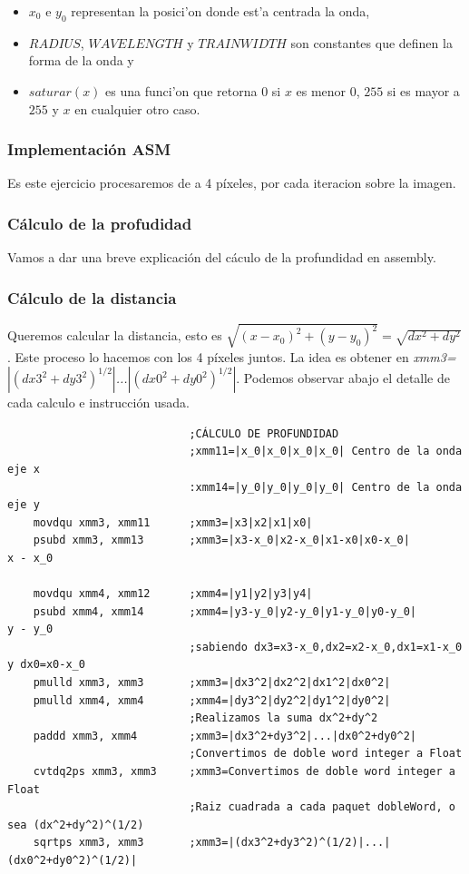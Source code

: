 \begin{itemize}
  \item $x_0$ e $y_0$ representan la posici'on donde est'a centrada la onda,
  \item $RADIUS$, $WAVELENGTH$ y $TRAINWIDTH$ son constantes que definen la 
  forma de la onda y
  \item $saturar(x)$ es una funci'on que retorna $0$ si $x$ es menor $0$, $255$
  si es mayor a $255$ y $x$ en cualquier otro caso.
\end{itemize}

\newpage
\subsubsection{Implementación ASM}
Es este ejercicio procesaremos de a 4 píxeles, por cada iteracion sobre la imagen.
\subsubsection*{Cálculo de la profudidad}
Vamos a dar una breve explicación del cáculo de la profundidad en assembly.

\subsubsection*{Cálculo de la distancia}

Queremos calcular la distancia, esto es $\sqrt{(x-x_0)^2+(y-y_0)^2} = \sqrt{dx^2+dy^2}$. Este proceso lo hacemos con los 4 píxeles juntos. La idea es obtener en \emph{xmm3=$|(dx3^2+dy3^2)^{1/2}|$...$|(dx0^2+dy0^2)^{1/2}|$}. Podemos observar abajo el detalle de cada calculo e instrucción usada.
\begin{codesnippet}
\begin{verbatim}
                            ;CÁLCULO DE PROFUNDIDAD
                            ;xmm11=|x_0|x_0|x_0|x_0| Centro de la onda eje x
                            :xmm14=|y_0|y_0|y_0|y_0| Centro de la onda eje y
    movdqu xmm3, xmm11      ;xmm3=|x3|x2|x1|x0| 
    psubd xmm3, xmm13       ;xmm3=|x3-x_0|x2-x_0|x1-x0|x0-x_0|                    x - x_0
							
    movdqu xmm4, xmm12      ;xmm4=|y1|y2|y3|y4|
    psubd xmm4, xmm14       ;xmm4=|y3-y_0|y2-y_0|y1-y_0|y0-y_0|                     y - y_0	
                            ;sabiendo dx3=x3-x_0,dx2=x2-x_0,dx1=x1-x_0 y dx0=x0-x_0
    pmulld xmm3, xmm3       ;xmm3=|dx3^2|dx2^2|dx1^2|dx0^2|
    pmulld xmm4, xmm4       ;xmm4=|dy3^2|dy2^2|dy1^2|dy0^2|
                            ;Realizamos la suma dx^2+dy^2
    paddd xmm3, xmm4        ;xmm3=|dx3^2+dy3^2|...|dx0^2+dy0^2|
                            ;Convertimos de doble word integer a Float
    cvtdq2ps xmm3, xmm3     ;xmm3=Convertimos de doble word integer a Float
                            ;Raiz cuadrada a cada paquet dobleWord, o sea (dx^2+dy^2)^(1/2)
    sqrtps xmm3, xmm3       ;xmm3=|(dx3^2+dy3^2)^(1/2)|...|(dx0^2+dy0^2)^(1/2)|
\end{verbatim}
\end{codesnippet}

